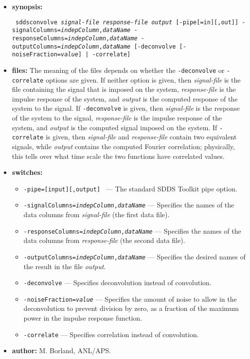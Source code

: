 \begin{itemize}
\item {\bf synopsis:}
\begin{flushleft}{\tt
sddsconvolve  {\em signal-file} {\em response-file} {\em output} [-pipe[=in][,out]]
 -signalColumns={\em indepColumn},{\em dataName}
 -responseColumns={\em indepColumn},{\em dataName}
 -outputColumns={\em indepColumn},{\em dataName}  
[{-deconvolve [-noiseFraction={\em value}] | -correlate}]
}\end{flushleft}
\item {\bf files:}
The meaning of the files depends on whether the {\tt -deconvolve} or {\tt -correlate}
options are given.
If neither option is given, then
{\em signal-file} is the file containing the signal that is imposed on the system,
{\em response-file} is the impulse response of the system, and 
{\em output} is the computed response of the system to the signal.
If {\tt -deconvolve} is given, then {\em signal-file} is the response of the
system to the signal, {\em response-file} is the impulse response of the system, and
{\em output} is the computed signal imposed on the system.
If {\tt -correlate} is given, then {\em signal-file} and {\em response-file} contain
two equivalent signals, while {\em output} contains the computed Fourier correlation;
physically, this tells over what time scale the two functions have correlated values.
\item {\bf switches:}
    \begin{itemize}
    \item {\tt -pipe=[input][,output] } --- The standard SDDS Toolkit pipe option.
        \item {\tt -signalColumns={\em indepColumn},{\em dataName}} --- Specifies the
        names of the data columns from {\em signal-file} (the first data file).
        \item {\tt -responseColumns={\em indepColumn},{\em dataName}} --- Specifies the
        names of the data columns from {\em response-file} (the second data file).
        \item {\tt -outputColumns={\em indepColumn},{\em dataName}} --- Specifies the
        desired names of the result in the file {\em output}.
        \item {\tt -deconvolve} --- Specifies deconvolution instead of convolution.
        \item {\tt -noiseFraction={\em value}} --- Specifies the amount of noise to
        allow in the deconvolution to prevent division by zero, as a fraction of the
        maximum power in the impulse response function.
        \item {\tt -correlate} --- Specifies correlation instead of convolution.
    \end{itemize}
\item {\bf author:} M. Borland, ANL/APS.
\end{itemize}


